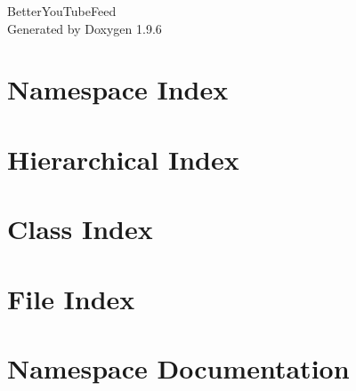 \documentclass[twoside]{book}
\newcommand{\+}{\discretionary{\mbox{\scriptsize$\hookleftarrow$}}{}{}}
\newcommand{\clearemptydoublepage}{%
    \newpage{\pagestyle{empty}\cleardoublepage}%
  }
\begin{document}
  \raggedbottom
    \hypersetup{pageanchor=false,
                bookmarksnumbered=true,
                pdfencoding=unicode
               }
  \begin{titlepage}
  \vspace*{7cm}
  \begin{center}%
  {\Large Better\+You\+Tube\+Feed}\\
  \vspace*{1cm}
  {\large Generated by Doxygen 1.9.6}\\
  \end{center}
  \end{titlepage}
  \clearemptydoublepage
  \tableofcontents
  \clearemptydoublepage
  \hypersetup{pageanchor=true}
\chapter{Namespace Index}

\chapter{Hierarchical Index}

\chapter{Class Index}

\chapter{File Index}

\chapter{Namespace Documentation}










\end{document}
